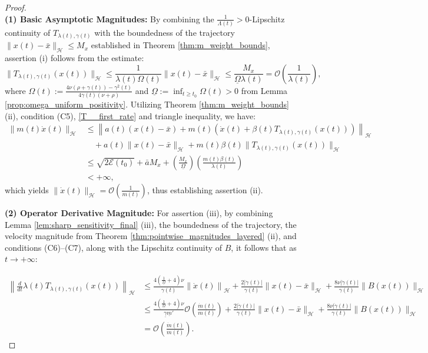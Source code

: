 \documentclass[10pt,a4paper]{amsart}
\begin{document}
\begin{proof}
\hfill \\
\noindent \textbf{(1) Basic Asymptotic Magnitudes:} By combining the $\frac{1}{\Lambda(t)}>0$-Lipschitz continuity of $T_{\lambda(t), \gamma(t)}$ with the boundedness of the trajectory $\|x(t) - \bar{x}\|_{\mathcal{H}} \le M_x$ established in Theorem \ref{thm:m_weight_bounds}, assertion (i) follows from the estimate:
\begin{equation}
\label{T__first_rate}
\|T_{\lambda(t), \gamma(t)}(x(t))\|_{\mathcal{H}} \le \frac{1}{\lambda(t) \Omega(t)} \|x(t) - \bar{x}\|_{\mathcal{H}} \le \frac{M_x}{\underline{\Omega} \lambda(t)} = \mathcal{O}\left( \frac{1}{\lambda(t)} \right),
\end{equation}
where $\Omega(t):=\frac{4\nu \left( \rho + \gamma(t) \right) - \gamma^2(t)}{4\gamma(t) \left( \nu + \rho \right)}$ and $\underline{\Omega} := \inf_{t \ge t_0} \Omega(t)> 0$ from Lemma \ref{prop:omega_uniform_positivity}. Utilizing Theorem \ref{thm:m_weight_bounds} (ii), condition (C5), \eqref{T__first_rate} and triangle inequality, we have:
\begin{align*}
\|m(t) \dot{x}(t)\|_{\mathcal{H}} &\le \left\| a(t) \left( x(t) - \bar{x} \right) + m(t) \left( \dot{x}(t) + \beta(t) T_{\lambda(t), \gamma(t)}(x(t)) \right) \right\|_{\mathcal{H}} \nonumber \\
&\quad + a(t)\|x(t) - \bar{x}\|_{\mathcal{H}} + m(t)\beta(t)\|T_{\lambda(t), \gamma(t)}(x(t))\|_{\mathcal{H}} \nonumber \\
&\le \sqrt{2\mathcal{E}(t_0)} + \bar{a} M_x + \left( \frac{M_x}{\underline{\Omega}} \right) \left( \frac{m(t)\beta(t)}{\lambda(t)} \right)\nonumber \\
&< + \infty,
\label{eq:m_isolation_refined}
\end{align*}
which yields $\|\dot{x}(t)\|_{\mathcal{H}} = \mathcal{O}\left( \frac{1}{m(t)} \right)$, thus establishing assertion (ii).

\noindent \textbf{ (2) Operator Derivative Magnitude:}
For assertion (iii), by combining Lemma \ref{lem:sharp_sensitivity_final} (iii), the boundedness of the trajectory, the velocity magnitude from Theorem \ref{thm:pointwise_magnitudes_layered} (ii), and conditions (C6)--(C7), along with the Lipschitz continuity of $B$, it follows that as $t \to +\infty$:

\begin{align}
\left\| \frac{d}{dt}\lambda(t)T_{\lambda(t),\gamma(t)}(x(t)) \right\|_{\mathcal{H}} &\le  \frac{4 \left( \frac{1}{\underline{\Omega}} + 4 \right)\nu}{\gamma(t)} \left\| \dot{x}(t) \right\|_{\mathcal{H}} + \frac{2 |\dot{\gamma}(t)|}{\gamma(t)} \| x(t) - \bar{x} \|_{\mathcal{H}} + \frac{8\nu |\dot{\gamma}(t)|}{\gamma(t)} \| B(x(t)) \|_{\mathcal{H}} \nonumber \\
&\le \frac{4 \left( \frac{1}{\underline{\Omega}} + 4 \right)\nu}{\underline{\gamma} \underline{m}'} \mathcal{O}\left( \frac{\dot{m}(t)}{m(t)} \right) +\frac{2 |\dot{\gamma}(t)|}{\gamma(t)} \| x(t) - \bar{x} \|_{\mathcal{H}} + \frac{8\nu |\dot{\gamma}(t)|}{\gamma(t)} \| B(x(t)) \|_{\mathcal{H}} \nonumber \\
&= \mathcal{O}\left( \frac{\dot{m}(t)}{m(t)} \right).
\end{align}


\end{proof}
\end{document}
